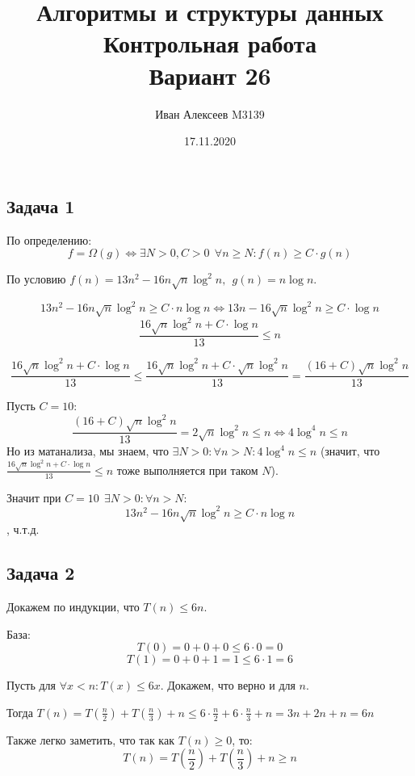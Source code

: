 \documentclass{article}
\title{Алгоритмы и структуры данных\\Контрольная работа \textnumero 1\\Вариант 26}
\date{17.11.2020}
\author{Иван Алексеев M3139}
\begin{document}
	\maketitle %
	\subsection*{Задача 1}
	\tab По определению: 
	$$f = \Omega(g) \Leftrightarrow \exists N > 0, C > 0 \ \ \forall n \geqslant N : f(n) \geqslant C \cdot g(n)$$
	
	По условию $f(n) = 13n^2 - 16n \sqrt{n} \log^2 n, \ \ g(n) = n \log n$.
	
	$$ 13n^2 - 16n \sqrt{n} \log^2 n \geqslant C \cdot n \log n \Leftrightarrow 13n - 16\sqrt{n} \log^2 n \geqslant C \cdot \log n$$
	$$\frac{16\sqrt{n} \log^2 n + C \cdot \log n}{13} \leqslant n$$
	
	$$\frac{16\sqrt{n} \log^2 n + C \cdot \log n}{13} \leqslant \frac{16\sqrt{n} \log^2 n + C \cdot\sqrt{n} \log^2 n}{13} = \frac{(16 + C)\sqrt{n} \log^2 n}{13}$$
	
	Пусть $C = 10$: 
	$$\frac{(16 + C)\sqrt{n} \log^2 n}{13} = 2\sqrt{n} \log^2 n \leqslant n \Leftrightarrow 4\log^4 n \leqslant n$$
	Но из матанализа, мы знаем, что $\exists N > 0 : \forall n > N : 4\log^4 n \leqslant n$ (значит, что $\frac{16\sqrt{n} \log^2 n + C \cdot \log n}{13} \leqslant n$ тоже выполняется при таком $N$).
	
	Значит при $C = 10 \ \ \exists N > 0 : \forall n > N :$
	$$13n^2 - 16n \sqrt{n} \log^2 n \geqslant C \cdot n \log n$$, ч.т.д.
	
	\subsection*{Задача 2}
	
    \tab Докажем по индукции, что $T(n) \leqslant 6n$.
    
    База: 
    $$T(0) = 0 + 0 + 0 \leqslant 6 \cdot 0 = 0$$
    $$T(1) = 0 + 0 + 1 = 1 \leqslant 6 \cdot 1 = 6$$
    
    Пусть для $\forall x < n : T(x) \leqslant 6x$. Докажем, что верно и для $n$. 
    
    Тогда $T(n) = T(\frac{n}{2}) + T(\frac{n}{3}) + n \leqslant 6 \cdot \frac{n}{2} + 6 \cdot \frac{n}{3} + n =3n + 2n + n = 6n $
    
    Также легко заметить, что так как $T(n) \geqslant 0$, то:
    $$ T(n) = T(\frac{n}{2}) + T(\frac{n}{3}) + n \geqslant n$$
    
\end{document}
